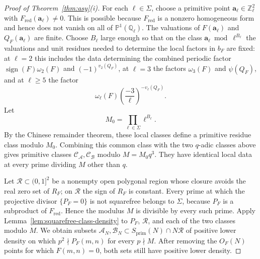 \documentclass[12pt,reqno]{amsart}
\numberwithin{equation}{section}
\theoremstyle{definition}
\renewcommand{\ge}{\geqslant}
\newcommand{\PP}{\mathbb{P}}
\newcommand{\ZZ}{\mathbb{Z}}
\newcommand{\QQ}{\mathbb{Q}}
\DeclareMathOperator{\sign}{sign}
\begin{document}
\begin{proof}[Proof of Theorem~\ref{thm:asy}(i)]
For each $\ell\in\Sigma$, choose a primitive point $\mathbf a_\ell\in\ZZ_\ell^2$ with $F_{\mathrm{red}}(\mathbf a_\ell)\ne0$.
This is possible because $F_{\mathrm{red}}$ is a nonzero homogeneous form and hence does not vanish on all of $\PP^1(\QQ_\ell)$.
The valuations of $F(\mathbf a_\ell)$ and $Q_F(\mathbf a_\ell)$ are finite.
Choose $B_\ell$ large enough so that on the class $\mathbf a_\ell\bmod \ell^{B_\ell}$ the valuations and unit residues needed to determine the local factors in $b_F$ are fixed: at $\ell=2$ this includes the data determining the combined periodic factor $\sign(F)\omega_2(F)$ and $(-1)^{v_2(Q_F)}$, at $\ell=3$ the factors $\omega_3(F)$ and $\psi(Q_F)$, and at $\ell\ge5$ the factor
\[
\omega_\ell(F)
\left(\frac{-3}{\ell}\right)^{-v_\ell(Q_F)}.
\]
Let
\[
M_0=\prod_{\ell\in\Sigma}\ell^{B_\ell}.
\]
By the Chinese remainder theorem, these local classes define a primitive residue class modulo $M_0$.
Combining this common class with the two $q$-adic classes above gives primitive classes $\mathcal C_\mathcal A,\mathcal C_\mathcal B$ modulo $M=M_0q^3$.
They have identical local data at every prime dividing $M$ other than $q$.

Let $\mathcal R\subset(0,1]^2$ be a nonempty open polygonal region whose closure avoids the real zero set of $R_F$; on $\mathcal R$ the sign of $R_F$ is constant.
Every prime at which the projective divisor $\{P_F=0\}$ is not squarefree belongs to $\Sigma$, because $P_F$ is a subproduct of $F_{\mathrm{red}}$.
Hence the modulus $M$ is divisible by every such prime.
Apply Lemma~\ref{lem:squarefree-class-density} to $P_F$, $\mathcal R$, and each of the two classes modulo $M$.
We obtain subsets $\mathcal A_N,\mathcal B_N\subset S_{\mathrm{prim}}(N)\cap N\mathcal R$ of positive lower density on which $p^2\nmid P_F(m,n)$ for every $p\nmid M$.
After removing the $O_F(N)$ points for which $F(m,n)=0$, both sets still have positive lower density.


\end{proof}
\end{document}
